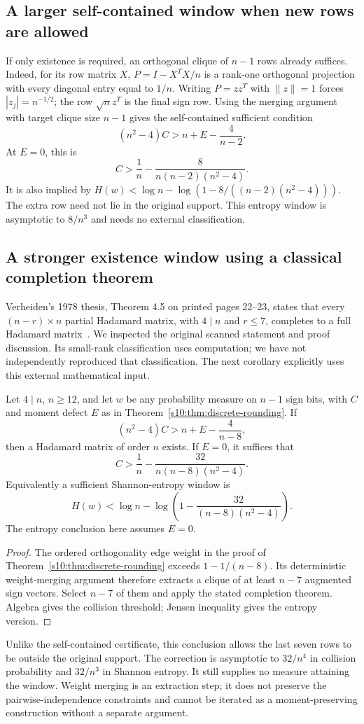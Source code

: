 \subsection{A larger self-contained window when new rows are allowed}
If only existence is required, an orthogonal clique of $n-1$ rows
already suffices. Indeed, for its row matrix $X$,
$P=I-X^TX/n$ is a rank-one orthogonal projection with every diagonal
entry equal to $1/n$. Writing $P=zz^T$ with $\|z\|=1$ forces
$|z_j|=n^{-1/2}$; the row $\sqrt n z^T$ is the final sign row.
Using the merging argument with target clique size $n-1$ gives the
self-contained sufficient condition
\[
 (n^2-4)C>n+E-\frac4{n-2}.
\]
At $E=0$, this is
\[
 C>\frac1n-\frac8{n(n-2)(n^2-4)}.
\]
It is also implied by
$H(w)<\log n-\log(1-8/((n-2)(n^2-4)))$.
The extra row need not lie in the original support. This entropy
window is asymptotic to $8/n^3$ and needs no external classification.

\subsection{A stronger existence window using a classical completion theorem}
Verheiden's 1978 thesis, Theorem 4.5 on printed pages 22--23,
states that every $(n-r)\times n$ partial Hadamard matrix, with
$4\mid n$ and $r\le7$, completes to a full Hadamard
matrix~\cite{Verheiden}. We inspected the original scanned statement
and proof discussion. Its small-rank classification uses computation;
we have not independently reproduced that classification. The next
corollary explicitly uses this external mathematical input.

\begin{corollary}\label{s07:cor:completion-rounding}
Let $4\mid n$, $n\ge12$, and let $w$ be any probability measure on
$n-1$ sign bits, with $C$ and moment defect $E$ as in
Theorem~\ref{s10:thm:discrete-rounding}. If
\[
 (n^2-4)C>n+E-\frac4{n-8},
\]
then a Hadamard matrix of order $n$ exists. If $E=0$, it suffices that
\[
 C>\frac1n-\frac{32}{n(n-8)(n^2-4)}.
\]
Equivalently a sufficient Shannon-entropy window is
\[
 H(w)<\log n-\log\left(1-\frac{32}{(n-8)(n^2-4)}\right).
\]
The entropy conclusion here assumes $E=0$.
\end{corollary}
\begin{proof}
The ordered orthogonality edge weight in the proof of
Theorem~\ref{s10:thm:discrete-rounding} exceeds $1-1/(n-8)$.
Its deterministic weight-merging argument therefore extracts a clique
of at least $n-7$ augmented sign vectors. Select $n-7$ of them and
apply the stated completion theorem. Algebra gives the collision
threshold; Jensen inequality gives the entropy version.
\end{proof}
Unlike the self-contained certificate, this conclusion allows the
last seven rows to be outside the original support. The correction
is asymptotic to $32/n^4$ in collision probability and $32/n^3$ in
Shannon entropy. It still supplies no measure attaining the window.
Weight merging is an extraction step; it does not preserve the
pairwise-independence constraints and cannot be iterated as a
moment-preserving construction without a separate argument.


